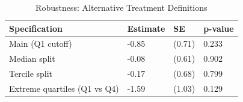 \begin{table}[!h]
\centering
\caption{\label{tab:tab:robust}Robustness: Alternative Treatment Definitions}
\centering
\begin{tabular}[t]{llll}
\toprule
Specification & Estimate & SE & p-value\\
\midrule
Main (Q1 cutoff) & -0.85 & (0.71) & 0.233\\
Median split & -0.08 & (0.61) & 0.902\\
Tercile split & -0.17 & (0.68) & 0.799\\
Extreme quartiles (Q1 vs Q4) & -1.59 & (1.03) & 0.129\\
\bottomrule
\end{tabular}
\end{table}

